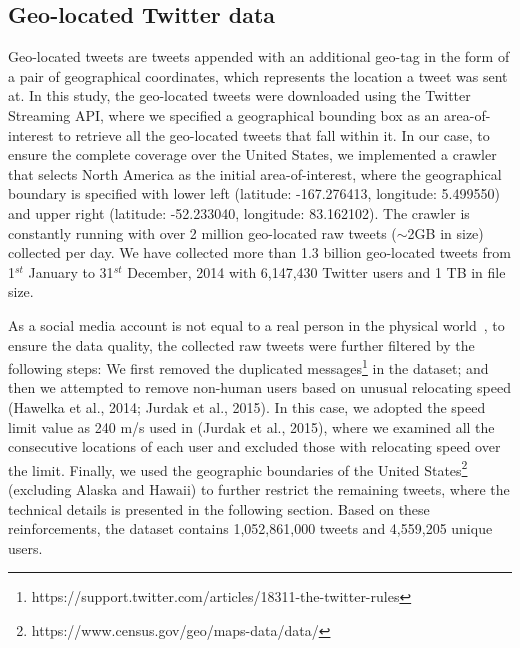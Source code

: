 \documentclass[a4paper, 11pt]{article}
\begin{document}
\subsection{Geo-located Twitter data}
Geo-located tweets are tweets appended with an additional geo-tag in the form of a pair of geographical coordinates, which represents the location a tweet was sent at. In this study, the geo-located tweets were downloaded using the Twitter Streaming API, where we specified a geographical bounding box as an area-of-interest to retrieve all the geo-located tweets that fall within it. 
In our case, to ensure the complete coverage over the United States, we implemented a crawler that selects North America as the initial area-of-interest, where the geographical boundary is specified with lower left (latitude: -167.276413, longitude: 5.499550) and upper right (latitude: -52.233040, longitude: 83.162102).
The crawler is constantly running with over 2 million geo-located raw tweets ($\sim$2GB in size) collected per day.
We have collected more than 1.3 billion geo-located tweets from 1$^{st}$ January to 31$^{st}$ December, 2014 with 6,147,430 Twitter users and 1 TB in file size.

As a social media account is not equal to a real person in the physical world~\citep{tsou2015}, to ensure the data quality, the collected raw tweets were further filtered by the following steps: We first removed the duplicated messages\footnote{https://support.twitter.com/articles/18311-the-twitter-rules} in the dataset; and then we attempted to remove non-human users based on unusual relocating speed (Hawelka et al., 2014; Jurdak et al., 2015). 
In this case, we adopted the speed limit value as 240 m/s used in (Jurdak et al., 2015), where we examined all the consecutive locations of each user and excluded those with relocating speed over the limit. 
Finally, we used the geographic boundaries of the United States\footnote{https://www.census.gov/geo/maps-data/data/} (excluding Alaska and Hawaii) to further restrict the remaining tweets, where the technical details is presented in the following section. Based on these reinforcements, the dataset contains 1,052,861,000 tweets and 4,559,205 unique users.
\end{document}
